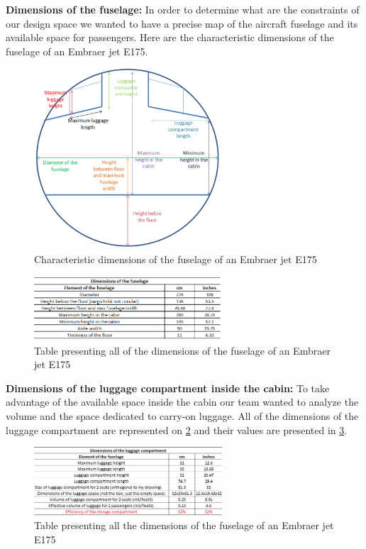 \textbf{Dimensions of the fuselage:}
In order to determine what are the constraints of our design space we wanted to have a precise map of the aircraft fuselage and its available space for passengers. Here are the characteristic dimensions of the fuselage of an Embraer jet E175.
\begin{figure}[h]
\centering
\includegraphics[width=7cm]{images/fuselage_dimensions}
\caption{Characteristic dimensions of the fuselage of an Embraer jet E175}
\label{fig: fuselage_dimensions}
\end{figure}

\begin{figure}[h]
\centering
\includegraphics[width=7cm]{images/fuselage_table}
\caption{Table presenting all of the dimensions of the fuselage of an Embraer jet E175}
\label{fig:fuselage_table}
\end{figure}

\textbf{Dimensions of the luggage compartment inside the cabin:}
To take advantage of the available space inside the cabin our team wanted to analyze the volume and the space dedicated to carry-on luggage. All of the dimensions of the luggage compartment are represented on \ref{fig:fuselage_table} and their values are presented in \ref{fig: luggage_compartment_table}.
\begin{figure}[h]
\centering
\includegraphics[width=7cm]{images/luggage_compartment_table.png}
\caption{Table presenting all the dimensions of the fuselage of an Embraer jet E175}
\label{fig: luggage_compartment_table}
\end{figure}

